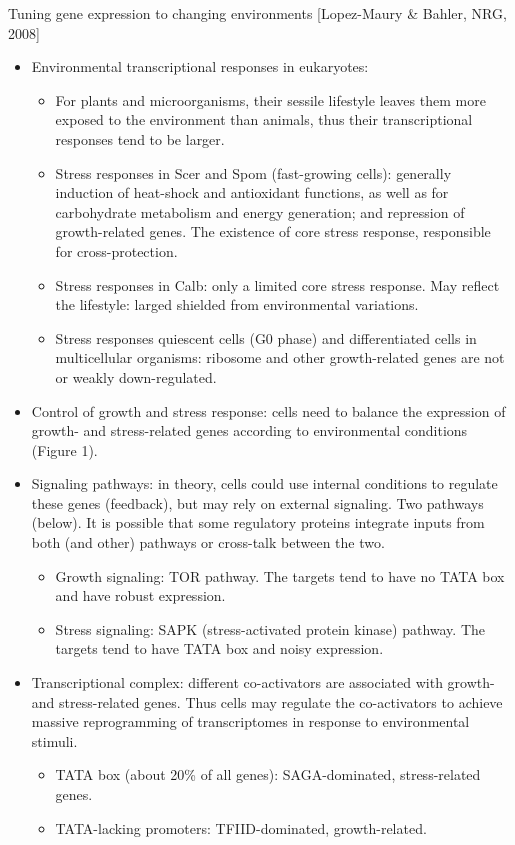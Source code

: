 \documentclass{report}
\begin{document}
Tuning gene expression to changing environments [Lopez-Maury \& Bahler, NRG, 2008]
\begin{itemize}
	\item Environmental transcriptional responses in eukaryotes: 
	\begin{itemize}
		\item For plants and microorganisms, their sessile lifestyle leaves them more exposed to the environment than animals, thus their transcriptional responses tend to be larger. 
		\item Stress responses in Scer and Spom (fast-growing cells): generally induction of heat-shock and antioxidant functions, as well as for carbohydrate metabolism and energy generation; and repression of growth-related genes. The existence of core stress response, responsible for cross-protection. 
		\item Stress responses in Calb: only a limited core stress response. May reflect the lifestyle: larged shielded from environmental variations. 
		\item Stress responses quiescent cells (G0 phase) and differentiated cells in multicellular organisms: ribosome and other growth-related genes are not or weakly down-regulated. 
	\end{itemize}
	
	\item Control of growth and stress response: cells need to balance the expression of growth- and stress-related genes according to environmental conditions (Figure 1). 
	
	\item Signaling pathways: in theory, cells could use internal conditions to regulate these genes (feedback), but may rely on external signaling. Two pathways (below). It is possible that some regulatory proteins integrate inputs from both (and other) pathways or cross-talk between the two. 
	\begin{itemize}
		\item Growth signaling: TOR pathway. The targets tend to have no TATA box and have robust expression. 
		\item Stress signaling: SAPK (stress-activated protein kinase) pathway. The targets tend to have TATA box and noisy expression. 
	\end{itemize}
	
	\item Transcriptional complex: different co-activators are associated with growth- and stress-related genes. Thus cells may regulate the co-activators to achieve massive reprogramming of transcriptomes in response to environmental stimuli. 
	\begin{itemize}
		\item TATA box (about 20\% of all genes): SAGA-dominated, stress-related genes.  
		\item TATA-lacking promoters: TFIID-dominated, growth-related. 
	\end{itemize}
\end{itemize}
\end{document}
